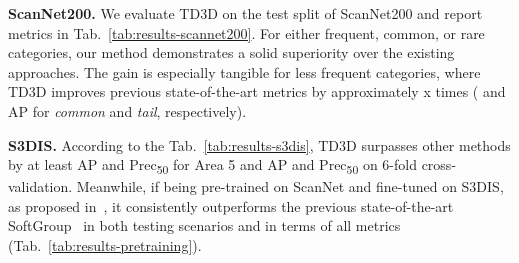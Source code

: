 \documentclass[10pt,twocolumn,letterpaper]{article}
\newcommand\inline{\noindent\textbf}
\begin{document}
\inline{ScanNet200.} We evaluate TD3D on the test split of ScanNet200 and report metrics in Tab.~\ref{tab:results-scannet200}. For either frequent, common, or rare categories, our method demonstrates a solid superiority over the existing approaches. The gain is especially tangible for less frequent categories, where TD3D improves previous state-of-the-art metrics by approximately x times ( and  AP for \textit{common} and \textit{tail}, respectively).

\inline{S3DIS.} According to the Tab.~\ref{tab:results-s3dis}, TD3D surpasses other methods by at least  AP and  Prec\textsubscript{50} for Area 5 and  AP and  Prec\textsubscript{50} on 6-fold cross-validation. Meanwhile, if being pre-trained on ScanNet and fine-tuned on S3DIS, as proposed in~\cite{chen2021hierarchical, vu2022softgroup}, it consistently outperforms the previous state-of-the-art SoftGroup~\cite{vu2022softgroup} in both testing scenarios and in terms of all metrics (Tab.~\ref{tab:results-pretraining}).
\end{document}
